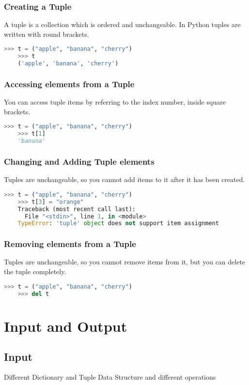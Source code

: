 \documentclass[11pt]{article}
\begin{document}
\subsubsection{Creating a Tuple}
A tuple is a collection which is ordered and unchangeable. In Python tuples are written with round brackets.
\begin{lstlisting}[language=Python]
	>>> t = ("apple", "banana", "cherry")
	>>> t
	('apple', 'banana', 'cherry')
\end{lstlisting}

\subsubsection{Accessing elements from a Tuple}
You can access tuple items by referring to the index number, inside square brackets.
\begin{lstlisting}[language=Python]
	>>> t = ("apple", "banana", "cherry")
	>>> t[1]
	'banana'
\end{lstlisting}

\subsubsection{Changing and Adding Tuple elements}
Tuples are unchangeable, so you cannot add items to it after it has been created.
\begin{lstlisting}[language=Python]
	>>> t = ("apple", "banana", "cherry")
	>>> t[3] = "orange" 
	Traceback (most recent call last):
	  File "<stdin>", line 1, in <module>
	TypeError: 'tuple' object does not support item assignment
\end{lstlisting}

\subsubsection{Removing elements from a Tuple}
Tuples are unchangeable, so you cannot remove items from it, but you can delete the tuple completely.
\begin{lstlisting}[language=Python]
	>>> t = ("apple", "banana", "cherry")
	>>> del t
\end{lstlisting}

\section{Input and Output}
\subsection{Input}
Different Dictionary and Tuple Data Structure and different operations
\end{document}
